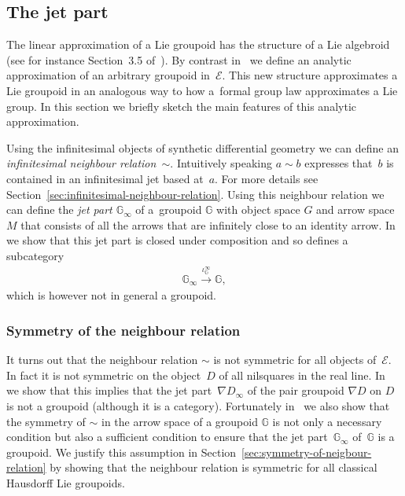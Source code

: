 \documentclass[10pt,a4paper]{amsart}
\numberwithin{equation}{section}
\begin{document}
\subsection{The jet part}

The linear approximation of a Lie groupoid has the structure of a Lie algebroid (see for instance Section~3.5 of~\cite{MR2157566}). By contrast in~\cite{burke-relative-to-local-models} we def\/ine an analytic approximation of an arbitrary groupoid in~$\mathcal{E}$. This new structure approximates a Lie groupoid in an analogous way to how a~formal group law approximates a Lie group. In this section we brief\/ly sketch the main features of this analytic approximation.

Using the inf\/initesimal objects of synthetic dif\/ferential geometry we can def\/ine an \emph{infinitesimal neighbour relation~$\sim$}. Intuitively speaking $a\sim b$ expresses that~$b$ is contained in an inf\/initesimal jet based at~$a$. For more details see Section~\ref{sec:infinitesimal-neighbour-relation}. Using this neighbour relation we can def\/ine the \emph{jet part $\mathbb{G}_{\infty}$} of a~groupoid $\mathbb{G}$ with object space $G$ and arrow space $M$ that consists of all the arrows that are inf\/initely close to an identity arrow. In~\cite{burke-relative-to-local-models} we show that this jet part is closed under composition and so def\/ines a subcategory
\begin{gather*}\mathbb{G}_{\infty} \xrightarrow{\iota_{\mathbb{G}}^{\infty}} \mathbb{G},\end{gather*}
which is however not in general a groupoid.

\subsubsection{Symmetry of the neighbour relation}

It turns out that the neighbour relation $\sim$ is not symmetric for all objects of~$\mathcal{E}$. In fact it is not symmetric on the object~$D$ of all nilsquares in the real line. In~\cite{burke-relative-to-local-models} we show that this implies that the jet part~$\nabla{D}_{\infty}$ of the pair groupoid $\nabla{D}$ on $D$ is not a groupoid (although it is a category). Fortunately in~\cite{burke-relative-to-local-models} we also show that the symmetry of $\sim$ in the arrow space of a groupoid $\mathbb{G}$ is not only a necessary condition but also a suf\/f\/icient condition to ensure that the jet part~$\mathbb{G}_{\infty}$ of~$\mathbb{G}$ is a groupoid. We justify this assumption in Section~\ref{sec:symmetry-of-neigbour-relation} by showing that the neighbour relation is symmetric for all classical Hausdorf\/f Lie groupoids.
\end{document}
